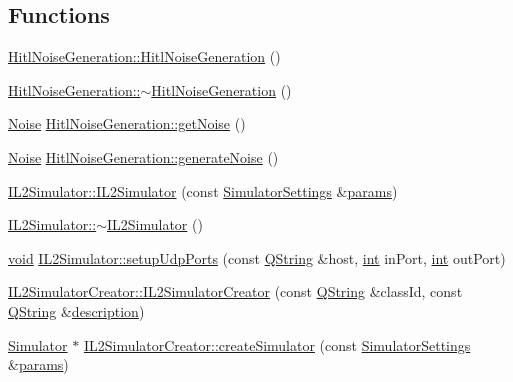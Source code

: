 \subsection*{Functions}
\begin{DoxyCompactItemize}
\item 
\hyperlink{group__hitlplugin_ga1dab19a6599c296ffb839d1449789da2}{Hitl\-Noise\-Generation\-::\-Hitl\-Noise\-Generation} ()
\item 
\hyperlink{group__hitlplugin_ga86eb1b28193cc2594ee5bd38658eb06a}{Hitl\-Noise\-Generation\-::$\sim$\-Hitl\-Noise\-Generation} ()
\item 
\hyperlink{struct_noise}{Noise} \hyperlink{group__hitlplugin_ga48da3a2284408957fb754e0e4488ab16}{Hitl\-Noise\-Generation\-::get\-Noise} ()
\item 
\hyperlink{struct_noise}{Noise} \hyperlink{group__hitlplugin_ga1492fee962eb0c1d6b48d8a4167d6d67}{Hitl\-Noise\-Generation\-::generate\-Noise} ()
\item 
\hyperlink{group__hitlplugin_gae9b990b18a524ff0201db3bbd5608950}{I\-L2\-Simulator\-::\-I\-L2\-Simulator} (const \hyperlink{group___h_i_t_l_plugin_ga052199f1328d3002bce3e45345aa7f4e}{Simulator\-Settings} \&\hyperlink{glext_8h_afeb6390ab3bc8a0e96a88aff34d52288}{params})
\item 
\hyperlink{group__hitlplugin_gaa5f298fa31201781813a733316fc02e4}{I\-L2\-Simulator\-::$\sim$\-I\-L2\-Simulator} ()
\item 
\hyperlink{group___u_a_v_objects_plugin_ga444cf2ff3f0ecbe028adce838d373f5c}{void} \hyperlink{group__hitlplugin_ga26c1964cdb6c16877509250d1ba197c7}{I\-L2\-Simulator\-::setup\-Udp\-Ports} (const \hyperlink{group___u_a_v_objects_plugin_gab9d252f49c333c94a72f97ce3105a32d}{Q\-String} \&host, \hyperlink{ioapi_8h_a787fa3cf048117ba7123753c1e74fcd6}{int} in\-Port, \hyperlink{ioapi_8h_a787fa3cf048117ba7123753c1e74fcd6}{int} out\-Port)
\item 
\hyperlink{group__hitlplugin_ga48d82430e3d3b6b0cc8fb1ed921a5ad0}{I\-L2\-Simulator\-Creator\-::\-I\-L2\-Simulator\-Creator} (const \hyperlink{group___u_a_v_objects_plugin_gab9d252f49c333c94a72f97ce3105a32d}{Q\-String} \&class\-Id, const \hyperlink{group___u_a_v_objects_plugin_gab9d252f49c333c94a72f97ce3105a32d}{Q\-String} \&\hyperlink{sdlgamepad_8dox_ae82208d022e4246ddf1e4f481a3f81b0}{description})
\item 
\hyperlink{class_simulator}{Simulator} $\ast$ \hyperlink{group__hitlplugin_gaea21540d2b8699f845b5a6969e5254ba}{I\-L2\-Simulator\-Creator\-::create\-Simulator} (const \hyperlink{group___h_i_t_l_plugin_ga052199f1328d3002bce3e45345aa7f4e}{Simulator\-Settings} \&\hyperlink{glext_8h_afeb6390ab3bc8a0e96a88aff34d52288}{params})

\end{DoxyCompactItemize}

